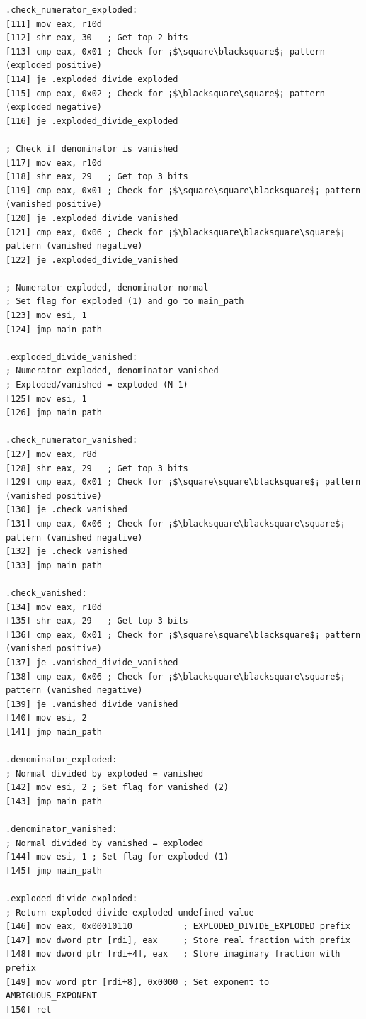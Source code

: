 \documentclass[12pt,letter]{article}
\begin{document}
\begin{lstlisting}[style=rust, caption={Complete Complex Division Assembly Implementation}, label={fig:circle_divide}]
.check_numerator_exploded:
[111] mov eax, r10d
[112] shr eax, 30   ; Get top 2 bits
[113] cmp eax, 0x01 ; Check for ¡$\square\blacksquare$¡ pattern (exploded positive)
[114] je .exploded_divide_exploded
[115] cmp eax, 0x02 ; Check for ¡$\blacksquare\square$¡ pattern (exploded negative)
[116] je .exploded_divide_exploded

; Check if denominator is vanished
[117] mov eax, r10d
[118] shr eax, 29   ; Get top 3 bits
[119] cmp eax, 0x01 ; Check for ¡$\square\square\blacksquare$¡ pattern (vanished positive)
[120] je .exploded_divide_vanished
[121] cmp eax, 0x06 ; Check for ¡$\blacksquare\blacksquare\square$¡ pattern (vanished negative)
[122] je .exploded_divide_vanished

; Numerator exploded, denominator normal
; Set flag for exploded (1) and go to main_path
[123] mov esi, 1
[124] jmp main_path

.exploded_divide_vanished:
; Numerator exploded, denominator vanished
; Exploded/vanished = exploded (N-1)
[125] mov esi, 1
[126] jmp main_path

.check_numerator_vanished:
[127] mov eax, r8d
[128] shr eax, 29   ; Get top 3 bits
[129] cmp eax, 0x01 ; Check for ¡$\square\square\blacksquare$¡ pattern (vanished positive)
[130] je .check_vanished
[131] cmp eax, 0x06 ; Check for ¡$\blacksquare\blacksquare\square$¡ pattern (vanished negative)
[132] je .check_vanished
[133] jmp main_path

.check_vanished:
[134] mov eax, r10d
[135] shr eax, 29   ; Get top 3 bits
[136] cmp eax, 0x01 ; Check for ¡$\square\square\blacksquare$¡ pattern (vanished positive)
[137] je .vanished_divide_vanished
[138] cmp eax, 0x06 ; Check for ¡$\blacksquare\blacksquare\square$¡ pattern (vanished negative)
[139] je .vanished_divide_vanished
[140] mov esi, 2
[141] jmp main_path

.denominator_exploded:
; Normal divided by exploded = vanished
[142] mov esi, 2 ; Set flag for vanished (2)
[143] jmp main_path

.denominator_vanished:
; Normal divided by vanished = exploded
[144] mov esi, 1 ; Set flag for exploded (1)
[145] jmp main_path

.exploded_divide_exploded:
; Return exploded divide exploded undefined value
[146] mov eax, 0x00010110          ; EXPLODED_DIVIDE_EXPLODED prefix
[147] mov dword ptr [rdi], eax     ; Store real fraction with prefix
[148] mov dword ptr [rdi+4], eax   ; Store imaginary fraction with prefix
[149] mov word ptr [rdi+8], 0x0000 ; Set exponent to AMBIGUOUS_EXPONENT
[150] ret


\end{lstlisting}
\end{document}
